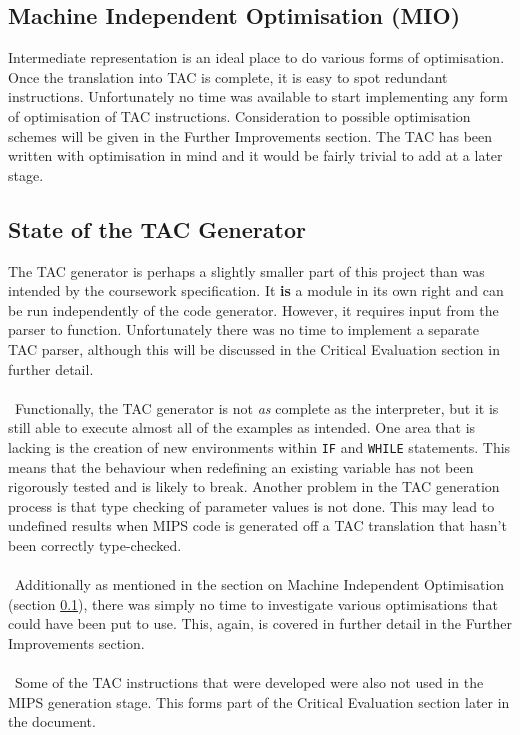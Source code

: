 \subsection{Machine Independent Optimisation (MIO)}
\label{sec:MIO}
Intermediate representation is an ideal place to do various forms of optimisation. Once the translation into TAC is complete, it is easy to spot redundant instructions. Unfortunately no time was available to start implementing any form of optimisation of TAC instructions. Consideration to possible optimisation schemes will be given in the Further Improvements section. The TAC has been written with optimisation in mind and it would be fairly trivial to add at a later stage.

\subsection{State of the TAC Generator}
The TAC generator is perhaps a slightly smaller part of this project than was intended by the coursework specification. It \textbf{is} a module in its own right and can be run independently of the code generator. However, it requires input from the parser to function. Unfortunately there was no time to implement a separate TAC parser, although this will be discussed in the Critical Evaluation section in further detail.
\\ \ \\ \
Functionally, the TAC generator is not \emph{as} complete as the interpreter, but it is still able to execute almost all of the examples as intended. One area that is lacking is the creation of new environments within \verb!IF! and \verb!WHILE! statements. This means that the behaviour when redefining an existing variable has not been rigorously tested and is likely to break. Another problem in the TAC generation process is that type checking of parameter values is not done. This may lead to undefined results when MIPS code is generated off a TAC translation that hasn't been correctly type-checked.
\\ \ \\ \
Additionally as mentioned in the section on Machine Independent Optimisation (section \ref{sec:MIO}), there was simply no time to investigate various optimisations that could have been put to use. This, again, is covered in further detail in the Further Improvements section.
\\ \ \\ \
Some of the TAC instructions that were developed were also not used in the MIPS generation stage. This forms part of the Critical Evaluation section later in the document.